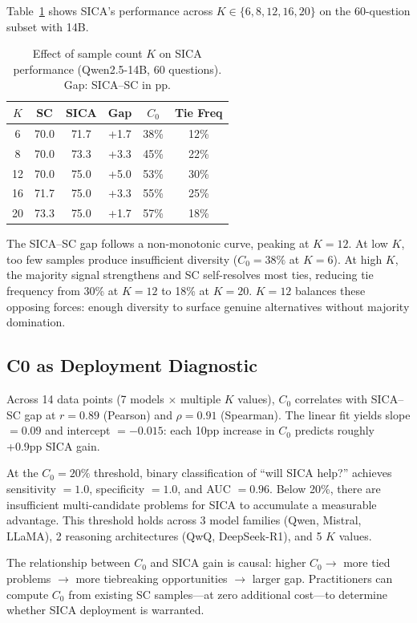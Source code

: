 \documentclass[11pt,a4paper]{article}
\begin{document}
Table~\ref{tab:k_sensitivity} shows SICA's performance across $K \in \{6, 8, 12, 16, 20\}$ on the 60-question subset with 14B.

\begin{table}[t]
\centering
\small
\caption{Effect of sample count $K$ on SICA performance (Qwen2.5-14B, 60 questions). Gap: SICA--SC in pp.}
\label{tab:k_sensitivity}
\begin{tabular}{cccccc}
\toprule
$K$ & SC & SICA & Gap & $C_0$ & Tie Freq \\
\midrule
6  & 70.0 & 71.7 & +1.7 & 38\% & 12\% \\
8  & 70.0 & 73.3 & +3.3 & 45\% & 22\% \\
12 & 70.0 & 75.0 & +5.0 & 53\% & 30\% \\
16 & 71.7 & 75.0 & +3.3 & 55\% & 25\% \\
20 & 73.3 & 75.0 & +1.7 & 57\% & 18\% \\
\bottomrule
\end{tabular}
\end{table}

The SICA--SC gap follows a non-monotonic curve, peaking at $K=12$. At low $K$, too few samples produce insufficient diversity ($C_0=38\%$ at $K=6$). At high $K$, the majority signal strengthens and SC self-resolves most ties, reducing tie frequency from 30\% at $K=12$ to 18\% at $K=20$. $K=12$ balances these opposing forces: enough diversity to surface genuine alternatives without majority domination.

\subsection{C0 as Deployment Diagnostic}
\label{sec:c0_diagnostic}

Across 14 data points (7 models $\times$ multiple $K$ values), $C_0$ correlates with SICA--SC gap at $r=0.89$ (Pearson) and $\rho=0.91$ (Spearman). The linear fit yields slope $= 0.09$ and intercept $= -0.015$: each 10pp increase in $C_0$ predicts roughly +0.9pp SICA gain.

At the $C_0=20\%$ threshold, binary classification of ``will SICA help?'' achieves sensitivity $= 1.0$, specificity $= 1.0$, and AUC $= 0.96$. Below 20\%, there are insufficient multi-candidate problems for SICA to accumulate a measurable advantage. This threshold holds across 3 model families (Qwen, Mistral, LLaMA), 2 reasoning architectures (QwQ, DeepSeek-R1), and 5 $K$ values.

The relationship between $C_0$ and SICA gain is causal: higher $C_0 \rightarrow$ more tied problems $\rightarrow$ more tiebreaking opportunities $\rightarrow$ larger gap. Practitioners can compute $C_0$ from existing SC samples---at zero additional cost---to determine whether SICA deployment is warranted.
\end{document}
